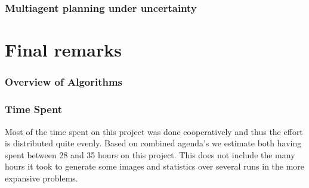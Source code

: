 \documentclass[10pt,a4paper]{article}
\begin{document}

\part{}


\section{Multiagent planning under uncertainty}


\part{Final remarks}


\section{Overview of Algorithms}


\section{Time Spent}
Most of the time spent on this project was done cooperatively and thus the effort is distributed quite evenly.
Based on combined agenda's we estimate both having spent between 28 and 35 hours on this project. 
This does not include the many hours it took to generate some images and statistics over several runs in the more expansive problems.
\end{document}
